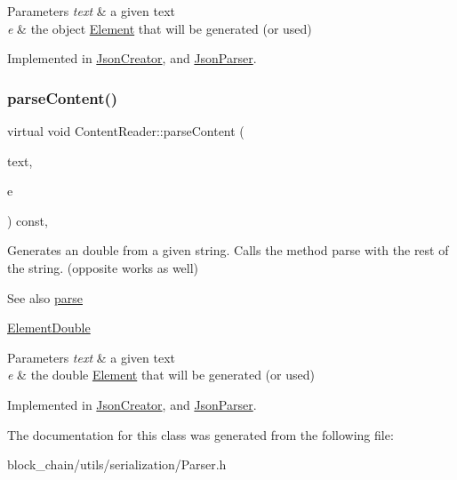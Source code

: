 \begin{DoxyParams}{Parameters}
{\em text} & a given text \\
\hline
{\em e} & the object \mbox{\hyperlink{classElement}{Element}} that will be generated (or used) \\
\hline
\end{DoxyParams}


Implemented in \mbox{\hyperlink{classJsonCreator_a9f57af1a7925074b8e3e4175f74c886a}{Json\+Creator}}, and \mbox{\hyperlink{classJsonParser_a7d4fad0f0947a74ca158dc1922c97355}{Json\+Parser}}.

\mbox{\label{classContentReader_ab4ba739ee5241848ae8af86e64e43a40}} 
\subsubsection{\texorpdfstring{parse\+Content()}{parseContent()}\hspace{0.1cm}{\footnotesize\ttfamily [6/6]}}
{\footnotesize\ttfamily virtual void Content\+Reader\+::parse\+Content (\begin{DoxyParamCaption}\item[{std\+::string \&}]{text,  }\item[{\mbox{\hyperlink{classElementDouble}{Element\+Double}} $\ast$}]{e }\end{DoxyParamCaption}) const\hspace{0.3cm}{\ttfamily [pure virtual]}, {\ttfamily [inherited]}}

Generates an double from a given string. Calls the method parse with the rest of the string. (opposite works as well) \begin{DoxySeeAlso}{See also}
\mbox{\hyperlink{classContentReader_a7fff2e63a2e8fa216665604f69974e1d}{parse}} 

\mbox{\hyperlink{classElementDouble}{Element\+Double}}
\end{DoxySeeAlso}

\begin{DoxyParams}{Parameters}
{\em text} & a given text \\
\hline
{\em e} & the double \mbox{\hyperlink{classElement}{Element}} that will be generated (or used) \\
\hline
\end{DoxyParams}


Implemented in \mbox{\hyperlink{classJsonCreator_a5e841806165fd5cb595d9f7d7c924080}{Json\+Creator}}, and \mbox{\hyperlink{classJsonParser_a07a4f2b10547d5f2251bc1f7b09d02c1}{Json\+Parser}}.



The documentation for this class was generated from the following file\+:\begin{DoxyCompactItemize}
\item 
block\+\_\+chain/utils/serialization/Parser.\+h\end{DoxyCompactItemize}
